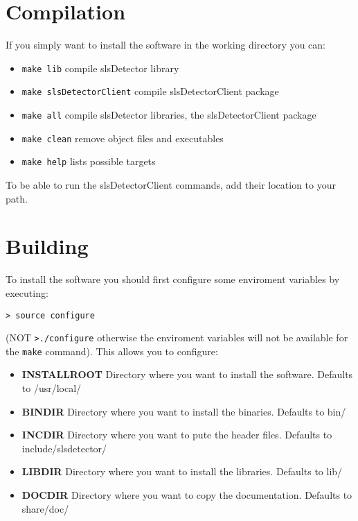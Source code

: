 \documentclass{report}
\begin{document}
\section{Compilation} 
If you simply want to install the software in the working directory you can:
\begin{itemize}
\item \verb=make lib=     	compile slsDetector library
\item \verb=make slsDetectorClient=  	compile slsDetectorClient package
\item \verb=make all=	compile slsDetector libraries, the slsDetectorClient package 
\item \verb=make clean=              remove object files and executables
\item \verb=make help=               lists possible targets
\end{itemize}

To be able to run the slsDetectorClient commands, add their location to your path.


\section{Building}
To install the software you should first configure some enviroment variables by executing: 
\begin{verbatim}
> source configure
\end{verbatim}
(NOT \verb=>./configure= otherwise the enviroment variables will not be available for the \verb=make= command). 
This allows you to configure:
\begin{itemize}
\item \textbf{INSTALLROOT} Directory where you want to install the software. Defaults to /usr/local/
\item \textbf{BINDIR} Directory where you want to install the binaries. Defaults to bin/
\item \textbf{INCDIR} Directory where you want to pute the header files. Defaults to include/slsdetector/
\item \textbf{LIBDIR} Directory where you want to install the libraries. Defaults to lib/
\item \textbf{DOCDIR} Directory where you want to copy the documentation. Defaults to share/doc/
\end{itemize}
\end{document}
